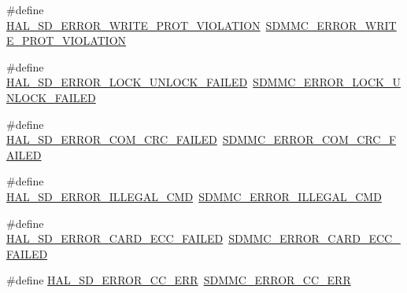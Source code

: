 \begin{DoxyCompactItemize}
\#define \mbox{\hyperlink{group___s_d___exported___constansts___group1_gaee9a354e9c1e185fa21701b3795cee02}{H\+A\+L\+\_\+\+S\+D\+\_\+\+E\+R\+R\+O\+R\+\_\+\+W\+R\+I\+T\+E\+\_\+\+P\+R\+O\+T\+\_\+\+V\+I\+O\+L\+A\+T\+I\+ON}}~\mbox{\hyperlink{group___s_d_m_m_c___l_l___exported___constants_gaf465a4ac14ab2c5509170f9a9948b03f}{S\+D\+M\+M\+C\+\_\+\+E\+R\+R\+O\+R\+\_\+\+W\+R\+I\+T\+E\+\_\+\+P\+R\+O\+T\+\_\+\+V\+I\+O\+L\+A\+T\+I\+ON}}
\item 
\#define \mbox{\hyperlink{group___s_d___exported___constansts___group1_ga77a987dc8ffbdfbf8a647a3f5ef42a22}{H\+A\+L\+\_\+\+S\+D\+\_\+\+E\+R\+R\+O\+R\+\_\+\+L\+O\+C\+K\+\_\+\+U\+N\+L\+O\+C\+K\+\_\+\+F\+A\+I\+L\+ED}}~\mbox{\hyperlink{group___s_d_m_m_c___l_l___exported___constants_ga36771b073b4605e40d2bb00354df6bc0}{S\+D\+M\+M\+C\+\_\+\+E\+R\+R\+O\+R\+\_\+\+L\+O\+C\+K\+\_\+\+U\+N\+L\+O\+C\+K\+\_\+\+F\+A\+I\+L\+ED}}
\item 
\#define \mbox{\hyperlink{group___s_d___exported___constansts___group1_ga89630158c180dcf0efe16c886d166b45}{H\+A\+L\+\_\+\+S\+D\+\_\+\+E\+R\+R\+O\+R\+\_\+\+C\+O\+M\+\_\+\+C\+R\+C\+\_\+\+F\+A\+I\+L\+ED}}~\mbox{\hyperlink{group___s_d_m_m_c___l_l___exported___constants_ga186a3ff3b5bd47d478ddbc58877c8115}{S\+D\+M\+M\+C\+\_\+\+E\+R\+R\+O\+R\+\_\+\+C\+O\+M\+\_\+\+C\+R\+C\+\_\+\+F\+A\+I\+L\+ED}}
\item 
\#define \mbox{\hyperlink{group___s_d___exported___constansts___group1_ga33c3e036649dd4f0f5df1ac5393f22ca}{H\+A\+L\+\_\+\+S\+D\+\_\+\+E\+R\+R\+O\+R\+\_\+\+I\+L\+L\+E\+G\+A\+L\+\_\+\+C\+MD}}~\mbox{\hyperlink{group___s_d_m_m_c___l_l___exported___constants_gad28ae2b183432ff4307f6ef736b9ac4e}{S\+D\+M\+M\+C\+\_\+\+E\+R\+R\+O\+R\+\_\+\+I\+L\+L\+E\+G\+A\+L\+\_\+\+C\+MD}}
\item 
\#define \mbox{\hyperlink{group___s_d___exported___constansts___group1_gaa7d19d06e1ee7d7cbbc45187fc1ed6f5}{H\+A\+L\+\_\+\+S\+D\+\_\+\+E\+R\+R\+O\+R\+\_\+\+C\+A\+R\+D\+\_\+\+E\+C\+C\+\_\+\+F\+A\+I\+L\+ED}}~\mbox{\hyperlink{group___s_d_m_m_c___l_l___exported___constants_gacefedcad3eb04c2edc0ef2ddbee00e42}{S\+D\+M\+M\+C\+\_\+\+E\+R\+R\+O\+R\+\_\+\+C\+A\+R\+D\+\_\+\+E\+C\+C\+\_\+\+F\+A\+I\+L\+ED}}
\item 
\#define \mbox{\hyperlink{group___s_d___exported___constansts___group1_gab7d095c031dbc2bc694fc266302db647}{H\+A\+L\+\_\+\+S\+D\+\_\+\+E\+R\+R\+O\+R\+\_\+\+C\+C\+\_\+\+E\+RR}}~\mbox{\hyperlink{group___s_d_m_m_c___l_l___exported___constants_ga5cbd52e71a9857f01b210e5048da5f44}{S\+D\+M\+M\+C\+\_\+\+E\+R\+R\+O\+R\+\_\+\+C\+C\+\_\+\+E\+RR}}
\item 

\end{DoxyCompactItemize}
